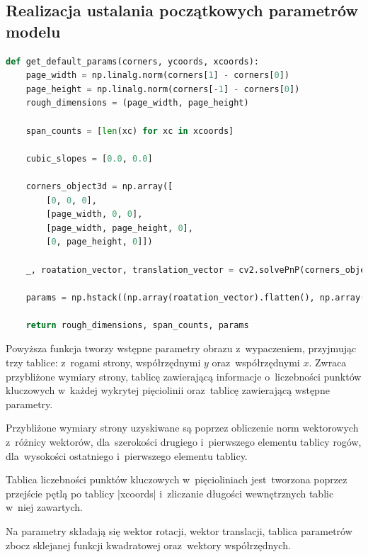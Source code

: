 \subsection{Realizacja ustalania początkowych parametrów modelu}
\begin{lstlisting}[caption={\pyth| get_default_params()| - funkcja tworząca początkowe parametry obrazu.}, label={get-default-params}, language=Python]
def get_default_params(corners, ycoords, xcoords):
	page_width = np.linalg.norm(corners[1] - corners[0])
	page_height = np.linalg.norm(corners[-1] - corners[0])
	rough_dimensions = (page_width, page_height)
	
	span_counts = [len(xc) for xc in xcoords]
	
	cubic_slopes = [0.0, 0.0]
	
	corners_object3d = np.array([
		[0, 0, 0],
		[page_width, 0, 0],
		[page_width, page_height, 0],
		[0, page_height, 0]])
	
	_, roatation_vector, translation_vector = cv2.solvePnP(corners_object3d, corners, CAMERA_MATRIX, np.zeros(5))
	
	params = np.hstack((np.array(roatation_vector).flatten(), np.array(translation_vector).flatten(), np.array(cubic_slopes).flatten(), ycoords.flatten()) + tuple(xcoords))
	
	return rough_dimensions, span_counts, params
\end{lstlisting}

Powyższa funkcja tworzy wstępne parametry obrazu z~wypaczeniem, przyjmując trzy tablice: z~rogami strony, współrzędnymi $y$ oraz~współrzędnymi $x$. Zwraca przybliżone wymiary strony, tablicę zawierającą informacje o~liczebności punktów kluczowych w~każdej wykrytej pięciolinii oraz~tablicę zawierającą wstępne parametry.

Przybliżone wymiary strony uzyskiwane są poprzez obliczenie norm wektorowych z~różnicy \linebreak wektorów, dla~szerokości drugiego i~pierwszego elementu tablicy rogów, dla~wysokości ostatniego i~pierwszego elementu tablicy. 

Tablica liczebności punktów kluczowych w~pięcioliniach jest~tworzona poprzez przejście pętlą \linebreak po tablicy \pyth|xcoords| i~zliczanie długości wewnętrznych tablic w~niej zawartych.

Na parametry składają się wektor rotacji, wektor translacji, tablica parametrów zbocz sklejanej funkcji kwadratowej oraz~wektory współrzędnych. 

